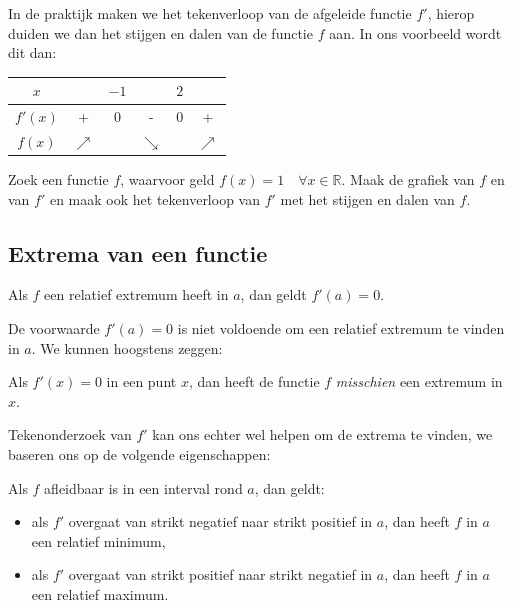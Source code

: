 \documentclass[12pt]{article}
\newenvironment{eigenschap}
{
  \begin{mdframed}[nobreak=true,frametitle={Eigenschap}]
  }{%
  \end{mdframed}
}
\newenvironment{kader}
{
  \begin{mdframed}[nobreak=true]
  }{%
  \end{mdframed}
}
\begin{document}
In de praktijk maken we het tekenverloop van de afgeleide functie $f'$, hierop duiden we dan het stijgen en dalen van de functie $f$ aan. In ons voorbeeld wordt dit dan:
\begin{center}
  \begin{tabular}{c|ccccc}
    $x$ & \hspace*{1.0cm} & $-1$ & \hspace*{1.0cm} & $2$ & \hspace*{1.0cm}\\
    \hline
    $f'(x)$ & + & 0 & - & 0 & +\\
    \hline
    $f(x)$ & $\nearrow$ & & $\searrow$ & & $\nearrow$
  \end{tabular}
\end{center}

\begin{oefening}
  Zoek een functie $f$, waarvoor geld $f(x)=1\quad \forall x\in\mathbb{R}$. Maak de grafiek van $f$ en van $f'$ en maak ook het tekenverloop van $f'$ met het stijgen en dalen van $f$.
\end{oefening}


\subsection{Extrema van een functie}

\begin{eigenschap}
  Als $f$ een relatief extremum heeft in $a$, dan geldt $f'(a)=0$.
\end{eigenschap}

De voorwaarde $f'(a)=0$ is niet voldoende om een relatief extremum te vinden in $a$. We kunnen hoogstens zeggen:

\begin{kader}
  Als $f'(x)=0$ in een punt $x$, dan heeft de functie $f$ {\em misschien} een extremum in $x$.
\end{kader}
Tekenonderzoek van $f'$ kan ons echter wel helpen om de extrema te vinden, we baseren ons op de volgende eigenschappen:

\begin{eigenschap}
  Als $f$ afleidbaar is in een interval rond $a$, dan geldt:
  \begin{itemize}
  \item als $f'$ overgaat van strikt negatief naar strikt positief in $a$, dan heeft $f$ in $a$ een relatief minimum,
  \item als $f'$ overgaat van strikt positief naar strikt negatief in $a$, dan heeft $f$ in $a$ een relatief maximum.
  \end{itemize}
\end{eigenschap}
\end{document}
